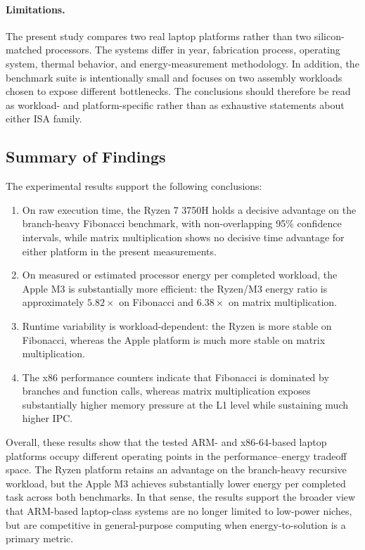 \documentclass{tcsa}
\begin{document}
\paragraph{Limitations.}
The present study compares two real laptop platforms rather than two
silicon-matched processors. The systems differ in year, fabrication
process, operating system, thermal behavior, and energy-measurement
methodology. In addition, the benchmark suite is intentionally small
and focuses on two assembly workloads chosen to expose different
bottlenecks. The conclusions should therefore be read as workload- and
platform-specific rather than as exhaustive statements about either ISA
family.

\subsection{Summary of Findings}
\label{sec:summary}

The experimental results support the following conclusions:

\begin{enumerate}
  \item On raw execution time, the Ryzen 7 3750H holds a decisive
        advantage on the branch-heavy Fibonacci benchmark, with
        non-overlapping 95\% confidence intervals, while matrix
        multiplication shows no decisive time advantage for either
        platform in the present measurements.
  \item On measured or estimated processor energy per completed workload, the Apple M3 is
        substantially more efficient: the Ryzen/M3 energy ratio is
        approximately $5.82\times$ on Fibonacci and $6.38\times$ on
        matrix multiplication.
  \item Runtime variability is workload-dependent: the Ryzen is more
        stable on Fibonacci, whereas the Apple platform is much more
        stable on matrix multiplication.
  \item The x86 performance counters indicate that Fibonacci is
        dominated by branches and function calls, whereas matrix
        multiplication exposes substantially higher memory pressure at
        the L1 level while sustaining much higher IPC.
\end{enumerate}

Overall, these results show that the tested ARM- and x86-64-based
laptop platforms occupy different operating points in the
performance--energy tradeoff space. The Ryzen platform retains an
advantage on the branch-heavy recursive workload, but the Apple M3
achieves substantially lower energy per completed task across both
benchmarks. In that sense, the results support the broader view that
ARM-based laptop-class systems are no longer limited to low-power
niches, but are competitive in general-purpose computing when
energy-to-solution is a primary metric.
\end{document}
